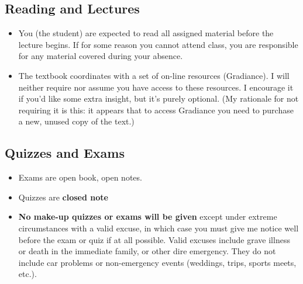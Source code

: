 \documentclass[11pt]{article}
\begin{document}
\subsection{Reading and Lectures}
\begin{itemize}
  \item
    You (the student) are expected to read all assigned
    material before the lecture begins. If for some reason
    you cannot attend class, you are responsible for any
    material covered during your absence.
  \item
    The textbook coordinates with a set of on-line
    resources (Gradiance). I will neither require nor
    assume you have access to these resources. I encourage
    it if you'd like some extra insight, but it's purely
    optional. (My rationale for not requiring it is this:
    it appears that to access Gradiance you need to
    purchase a new, unused copy of the text.)
\end{itemize}
\subsection{Quizzes and Exams}
\begin{itemize}
  \item
    Exams are open book, open notes.
  \item
    Quizzes are \textbf{closed note}
  \item
    \textbf{No make-up quizzes or exams will be given}
    except under extreme circumstances with a valid
    excuse, in which case you must give me notice well
    before the exam or quiz if at all possible. Valid
    excuses include grave illness or death in the
    immediate family, or other dire emergency. They do not
    include car problems or non-emergency events
    (weddings, trips, sports meets, etc.).
\end{itemize}
\end{document}
